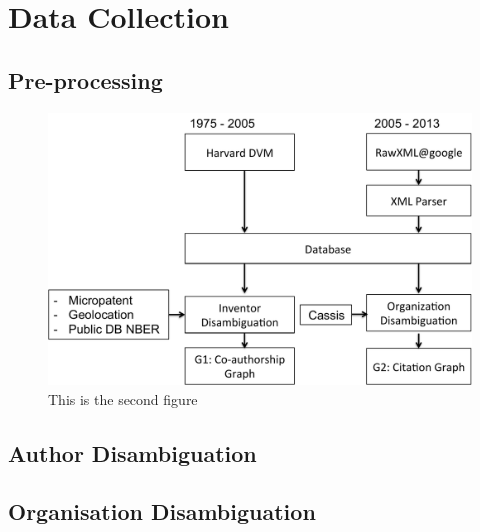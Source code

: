 \section{Data Collection}

\subsection{Pre-processing}

\begin{figure}[H]
		  \centering	
          \includegraphics[scale=0.6]{../figures/process.pdf}
          \caption{This is the second figure}
\end{figure}

\subsection{Author Disambiguation}

\subsection{Organisation Disambiguation}

